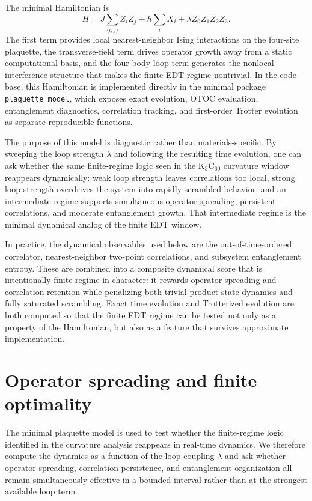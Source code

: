 ﻿\documentclass[aps,prx,reprint,superscriptaddress,longbibliography,floatfix]{revtex4-2}
\begin{document}
The minimal Hamiltonian is
\begin{equation}
H =
J \sum_{\langle i,j\rangle} Z_i Z_j
+
h \sum_i X_i
+
\lambda Z_0 Z_1 Z_2 Z_3.
\end{equation}
The first term provides local nearest-neighbor Ising interactions on the four-site plaquette, the transverse-field term drives operator growth away from a static computational basis, and the four-body loop term generates the nonlocal interference structure that makes the finite EDT regime nontrivial. In the code base, this Hamiltonian is implemented directly in the minimal package \texttt{plaquette\_model}, which exposes exact evolution, OTOC evaluation, entanglement diagnostics, correlation tracking, and first-order Trotter evolution as separate reproducible functions.

The purpose of this model is diagnostic rather than materials-specific. By sweeping the loop strength $\lambda$ and following the resulting time evolution, one can ask whether the same finite-regime logic seen in the K$_3$C$_{60}$ curvature window reappears dynamically: weak loop strength leaves correlations too local, strong loop strength overdrives the system into rapidly scrambled behavior, and an intermediate regime supports simultaneous operator spreading, persistent correlations, and moderate entanglement growth. That intermediate regime is the minimal dynamical analog of the finite EDT window.

In practice, the dynamical observables used below are the out-of-time-ordered correlator, nearest-neighbor two-point correlations, and subsystem entanglement entropy. These are combined into a composite dynamical score that is intentionally finite-regime in character: it rewards operator spreading and correlation retention while penalizing both trivial product-state dynamics and fully saturated scrambling. Exact time evolution and Trotterized evolution are both computed so that the finite EDT regime can be tested not only as a property of the Hamiltonian, but also as a feature that survives approximate implementation.


\section{Operator spreading and finite optimality}

The minimal plaquette model is used to test whether the finite-regime logic identified in the curvature analysis reappears in real-time dynamics. We therefore compute the dynamics as a function of the loop coupling $\lambda$ and ask whether operator spreading, correlation persistence, and entanglement organization all remain simultaneously effective in a bounded interval rather than at the strongest available loop term.
\end{document}
